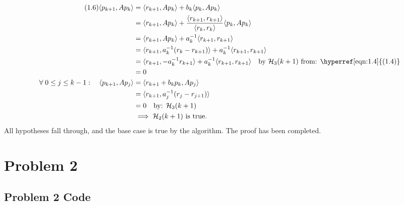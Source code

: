 \documentclass[]{article}
\begin{document}
    \begin{align*}\tag{1.6}\label{eqn:1.6}
        \langle p_{k + 1}, Ap_k\rangle &= 
        \langle r_{k + 1}, Ap_k\rangle + b_k\langle  p_k, Ap_k\rangle
        \\
        &= \langle r_{k + 1}, Ap_k\rangle + 
        \frac{\langle r_{k + 1}, r_{k + 1}\rangle}{\langle r_k, r_k\rangle}\langle p_k, Ap_k\rangle
        \\
        &= \langle r_{k + 1}, Ap_k\rangle + 
        a_k^{-1}\langle r_{k + 1}, r_{k + 1}\rangle
        \\
        &= \langle r_{k + 1}, a_{k}^{-1}(r_k - r_{k + 1})\rangle + 
        a_k^{-1}\langle r_{k + 1}, r_{k + 1}\rangle
        \\
        &= \langle r_{k + 1}, - a_{k}^{-1}r_{k + 1}\rangle + 
        a_k^{-1}\langle r_{k + 1}, r_{k + 1}\rangle \quad \text{by }\mathcal{H}_3(k + 1) \text{ from: \hyperref[eqn:1.4]{(1.4)}}
        \\
        &= 0
        \\
        \forall\; 0 \le j \le k - 1: \quad 
        \langle p_{k + 1}, Ap_j\rangle &= \langle r_{k + 1} + b_kp_k, Ap_j\rangle
        \\
        &= \langle r_{k + 1}, a_j^{-1}(r_j - r_{j + 1})\rangle
        \\
        &= 0 \quad \text{by: } \mathcal{H}_3(k + 1)
        \\
        & \implies \mathcal{H}_2(k + 1)\text{ is true}.
    \end{align*}
    All hypotheses fall through, and the base case is true by the algorithm. The proof has been completed. 

\section*{Problem 2}
    \subsection*{Problem 2 Code}
        
\end{document}
